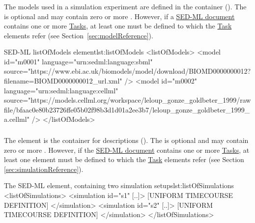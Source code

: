 \subsubsection{}
\label{class:listOfModels}
The models used in a simulation experiment are defined in the  container (). The  is optional and may contain zero or more \Models. However, if a \hyperref[class:sed-ml]{SED-ML document} contains one or more \hyperref[class:abstractTask]{Tasks}, at least one \Model must be defined to which the \hyperref[class:abstractTask]{Task} elements refer (see Section~\ref{sec:modelReference}).


\begin{myXmlLst}{SED-ML listOfModels element}{lst:listOfModels}
<listOfModels>
	<model id="m0001" language="urn:sedml:language:sbml" 
		source="https://www.ebi.ac.uk/biomodels/model/download/BIOMD0000000012?filename=BIOMD0000000012_url.xml" />
	<model id="m0002" language="urn:sedml:language:cellml" 
		source="https://models.cellml.org/workspace/leloup_gonze_goldbeter_1999/rawfile/bfaac0e80b23726ffe05b02f98b3d1d01a2ee3b7/leloup_gonze_goldbeter_1999_a.cellml" />
</listOfModels>
\end{myXmlLst}


\subsubsection{}
\label{class:listOfSimulations}
The  element is the container for \Simulation descriptions (). The  is optional and may contain zero or more \Simulations. However, if the \hyperref[class:sed-ml]{SED-ML document} contains one or more \hyperref[class:abstractTask]{Tasks}, at least one \Simulation element must be defined to which the \hyperref[class:abstractTask]{Task} elements refer (see Section \ref{sec:simulationReference}).

\begin{myXmlLst}{The SED-ML  element, containing two simulation setups}{lst:listOfSimulations}
<listOfSimulations>
	<simulation id="s1" [..]>
		[UNIFORM TIMECOURSE DEFINITION]
	</simulation>
	<simulation id="s2" [..]>
   		[UNIFORM TIMECOURSE DEFINITION]
	</simulation>
</listOfSimulations>
\end{myXmlLst}
 
